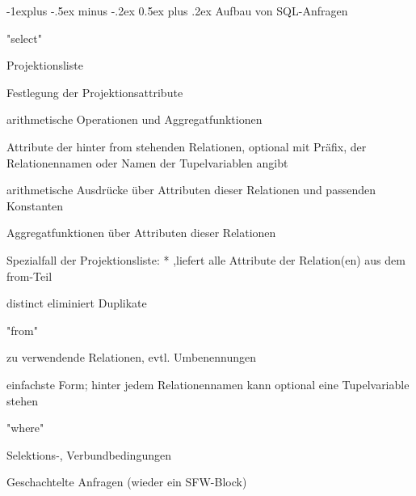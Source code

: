 \documentclass[a4paper]{article}
\makeatletter
\renewcommand{\subsection}{\@startsection{subsection}{2}{0mm}%
                                {-1explus -.5ex minus -.2ex}%
                                {0.5ex plus .2ex}%
                                {\normalfont\normalsize\bfseries}}
\makeatother
\begin{document}
\begin{multicols}{3}
\subsection{Aufbau von SQL-Anfragen}
\begin{itemize*}
    \item "select"
    \begin{itemize*}
        \item Projektionsliste
        \item Festlegung der Projektionsattribute
        \item arithmetische Operationen und Aggregatfunktionen
        \item Attribute der hinter from stehenden Relationen, optional mit Präfix, der Relationennamen oder Namen der Tupelvariablen angibt
        \item arithmetische Ausdrücke über Attributen dieser Relationen und passenden Konstanten
        \item Aggregatfunktionen über Attributen dieser Relationen
        \item Spezialfall der Projektionsliste: * ,liefert alle Attribute der Relation(en) aus dem from-Teil
        \item distinct eliminiert Duplikate
    \end{itemize*}
    \item "from"
    \begin{itemize*}
        \item zu verwendende Relationen, evtl. Umbenennungen
        \item einfachste Form; hinter jedem Relationennamen kann optional eine Tupelvariable stehen
    \end{itemize*}
    \item "where"
    \begin{itemize*}
        \item Selektions-, Verbundbedingungen
        \item Geschachtelte Anfragen (wieder ein SFW-Block)
    \end{itemize*}
\end{itemize*}


\end{multicols}
\end{document}
